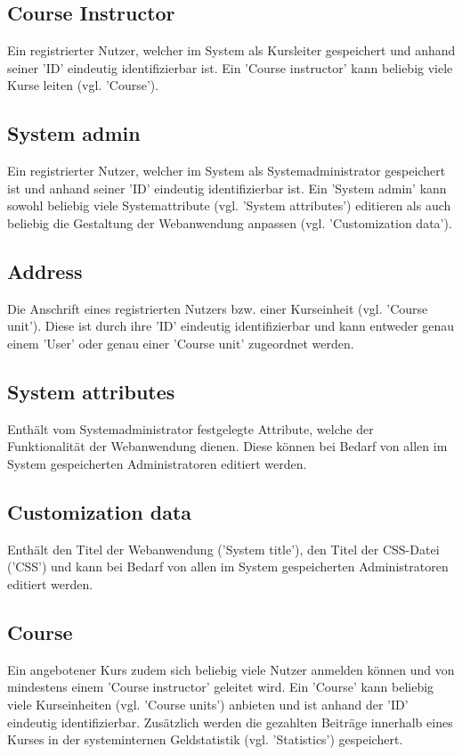 \subsection{Course Instructor}
Ein registrierter Nutzer, welcher im System als Kursleiter gespeichert und anhand seiner 'ID' eindeutig identifizierbar ist. Ein 'Course instructor' kann beliebig viele Kurse leiten (vgl. 'Course').

\subsection{System admin}
Ein registrierter Nutzer, welcher im System als Systemadministrator gespeichert ist und anhand seiner 'ID' eindeutig identifizierbar ist. Ein 'System admin' kann sowohl beliebig viele Systemattribute (vgl. 'System attributes') editieren als auch beliebig die Gestaltung der Webanwendung anpassen (vgl. 'Customization data').

\subsection{Address}
Die Anschrift eines registrierten Nutzers bzw. einer Kurseinheit (vgl. 'Course unit'). Diese ist durch ihre 'ID' eindeutig identifizierbar und kann entweder genau einem 'User' oder genau einer 'Course unit' zugeordnet werden.

\subsection{System attributes}
Enthält vom Systemadministrator festgelegte Attribute, welche der Funktionalität der Webanwendung dienen. Diese können bei Bedarf von allen im System gespeicherten Administratoren editiert werden.

\subsection{Customization data}
Enthält den Titel der Webanwendung ('System title'), den Titel der CSS-Datei ('CSS') und kann bei Bedarf von allen im System gespeicherten Administratoren editiert werden.

\subsection{Course}
Ein angebotener Kurs zudem sich beliebig viele Nutzer anmelden können und von mindestens einem 'Course instructor' geleitet wird. Ein 'Course' kann beliebig viele Kurseinheiten (vgl. 'Course units') anbieten und ist anhand der 'ID' eindeutig identifizierbar. Zusätzlich werden die gezahlten Beiträge innerhalb eines Kurses in der systeminternen Geldstatistik (vgl. 'Statistics') gespeichert.

